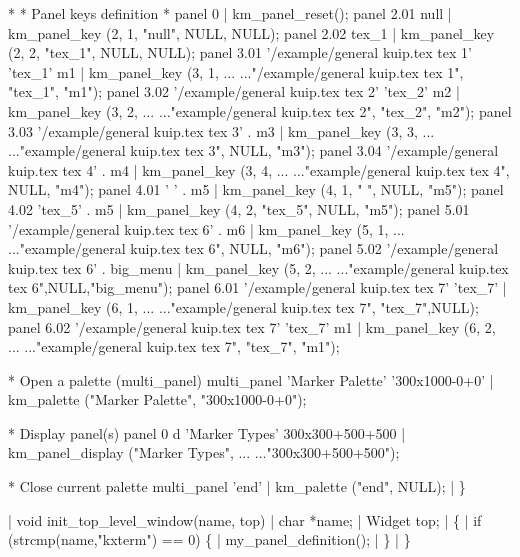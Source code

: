 \begin{XMP}
*
* Panel keys definition
*
panel 0                  |       km_panel_reset();
panel 2.01 null          |       km_panel_key (2, 1, "null", NULL, NULL);
panel 2.02 tex_1         |       km_panel_key (2, 2, "tex_1", NULL, NULL);
panel 3.01 '/example/general kuip.tex tex 1' 'tex_1' m1
                         |       km_panel_key (3, 1, ...
                           ..."/example/general kuip.tex tex 1", "tex_1", "m1");
panel 3.02 '/example/general kuip.tex tex 2' 'tex_2' m2
                         |       km_panel_key (3, 2, ...
                           ..."example/general kuip.tex tex 2", "tex_2", "m2");
panel 3.03 '/example/general kuip.tex tex 3' . m3
                         |       km_panel_key (3, 3, ...
                           ..."example/general kuip.tex tex 3", NULL, "m3");
panel 3.04 '/example/general kuip.tex tex 4' . m4
                         |       km_panel_key (3, 4, ...
                           ..."example/general kuip.tex tex 4", NULL, "m4");
panel 4.01 ' ' . m5      |       km_panel_key (4, 1, " ", NULL, "m5");
panel 4.02 'tex_5' . m5  |       km_panel_key (4, 2, "tex_5", NULL, "m5");
panel 5.01 '/example/general kuip.tex tex 6' . m6
                         |       km_panel_key (5, 1, ...
                           ..."example/general kuip.tex tex 6", NULL, "m6");
panel 5.02 '/example/general kuip.tex tex 6' . big_menu
                         |       km_panel_key (5, 2, ...
                           ..."example/general kuip.tex tex 6",NULL,"big_menu");
panel 6.01 '/example/general kuip.tex tex 7' 'tex_7'
                         |       km_panel_key (6, 1, ...
                           ..."example/general kuip.tex tex 7", "tex_7",NULL);
panel 6.02 '/example/general kuip.tex tex 7' 'tex_7' m1
                         |       km_panel_key (6, 2, ...
                           ..."example/general kuip.tex tex 7", "tex_7", "m1");
 
* Open a palette (multi_panel)
multi_panel 'Marker Palette' '300x1000-0+0'
                         |       km_palette ("Marker Palette", "300x1000-0+0");
 
* Display panel(s)
panel 0 d 'Marker Types' 300x300+500+500
                         |       km_panel_display ("Marker Types", ...
                           ..."300x300+500+500");
 
* Close current palette
multi_panel 'end'        |       km_palette ("end", NULL);
                         |     \}
 
                         |     void init_top_level_window(name, top)
                         |         char *name;
                         |         Widget top;
                         |     \{
                         |       if (strcmp(name,"kxterm") == 0) \{
                         |         my_panel_definition();
                         |       \}
                         |     \}
\end{XMP}
 
